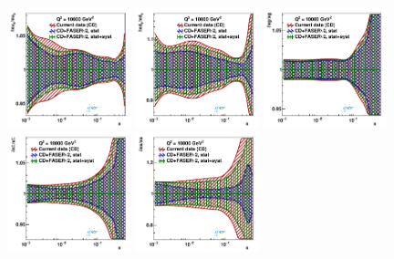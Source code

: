 \begin{figure}[t]
\centering
\includegraphics[width=0.32\textwidth]{plots/proton_fasernu2/inclusive+charm_chargediscrimination/systVar05_FASERv2_q2_10000_pdf_uv_ratio.pdf}
\includegraphics[width=0.32\textwidth]{plots/proton_fasernu2/inclusive+charm_chargediscrimination/systVar05_FASERv2_q2_10000_pdf_dv_ratio.pdf}
\includegraphics[width=0.32\textwidth]{plots/proton_fasernu2/inclusive+charm_chargediscrimination/systVar05_FASERv2_q2_10000_pdf_g_ratio.pdf}\\
\includegraphics[width=0.32\textwidth]{plots/proton_fasernu2/inclusive+charm_chargediscrimination/systVar05_FASERv2_q2_10000_pdf_Sea_ratio.pdf}
\includegraphics[width=0.32\textwidth]{plots/proton_fasernu2/inclusive+charm_chargediscrimination/systVar05_FASERv2_q2_10000_pdf_s_ratio.pdf}

\end{figure}
